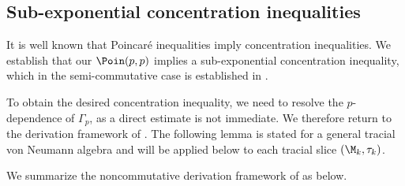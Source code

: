 \documentclass[sn-mathphys-num]{sn-jnl}
\begin{document}
\subsection{Sub-exponential concentration inequalities}
It is well known that Poincar\'e inequalities imply concentration inequalities. We establish that our $\Poin(p,p)$ implies a sub-exponential concentration inequality, which in the semi-commutative case is established in \cite[Thm~2.7]{huang2021poincare}.

To obtain the desired concentration inequality, we need to resolve the
$p$-dependence of $\Gamma_p$, as a direct estimate is not immediate. We therefore return to the derivation framework of
\cite{JungeRicardShlyakhtenko2025}. The following lemma is stated for a
general tracial von Neumann algebra and will be applied below to each
tracial slice $(\M_k,\tau_k)$.

We summarize the noncommutative derivation framework of
\cite[Prop.~2.6, Prop.~2.22]{JungeRicardShlyakhtenko2025} as below.
\end{document}
